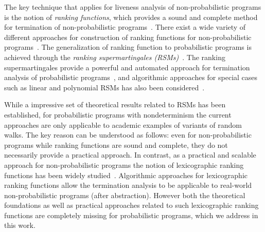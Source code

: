 \smallskip{}
The key technique that applies for liveness analysis of non-probabilistic programs is 
the notion of {\em ranking functions}, which provides a sound and complete 
method for termination of non-probabilistic programs~\cite{rwfloyd1967programs}.
There exist a wide variety of different approaches for construction 
of ranking functions for non-probabilistic programs~\cite{DBLP:conf/cav/BradleyMS05,DBLP:conf/tacas/ColonS01,DBLP:conf/vmcai/PodelskiR04,DBLP:conf/pods/SohnG91}.
The generalization of ranking function to probabilistic programs is achieved through the
{\em ranking supermartingales (RSMs)}~\cite{}.
The ranking supermartingales provide a powerful and automated approach for termination 
analysis of probabilistic programs~\cite{SRIRAM,HOLGER,HONGFEI}, and algorithmic 
approaches for special cases such as linear and polynomial RSMs has
also been considered~\cite{POPL,CAV,POPL}.



\smallskip{} 
While a impressive set of theoretical results related to RSMs has been
established, for probabilistic programs with nondeterminism the current approaches  
are only applicable to academic examples of variants of random walks. 
The key reason can be understood as follows: even for non-probabilistic programs while 
ranking functions are sound and complete, they do not necessarily provide a practical 
approach. 
In contrast, as a practical and scalable approach for non-probabilistic programs the 
notion of lexicographic ranking functions has been widely studied~\cite{}. 
Algorithmic approaches for lexicographic ranking functions allow the termination analysis 
to be applicable to real-world non-probabilistic programs (after abstraction).
However both the theoretical foundations as well as practical approaches related to 
such lexicographic ranking functions are completely missing for probabilistic programs,
which we address in this work.







